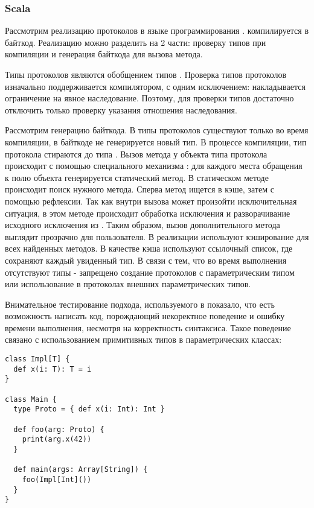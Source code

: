 \subsubsection{Scala}
Рассмотрим реализацию протоколов в языке программирования \cite{scala:structural}.  компилируется в  байткод. Реализацию можно разделить на 2 части: проверку типов при компиляции и генерация байткода для вызова метода.

Типы протоколов являются обобщением типов . Проверка типов протоколов изначально поддерживается компилятором, с одним исключением: накладывается ограничение на явное наследование. Поэтому, для проверки типов достаточно отключить только проверку указания отношения наследования.

Рассмотрим генерацию байткода. В  типы протоколов существуют только во время компиляции, в байткоде не генерируется новый тип. В процессе компиляции, тип протокола стираются до типа . Вызов метода у объекта типа протокола происходит с помощью специального механизма : для каждого места обращения к полю объекта генерируется статический метод. В статическом методе происходит поиск нужного метода. Сперва метод ищется в кэше, затем с помощью рефлексии. Так как внутри вызова может произойти исключительная ситуация, в этом методе происходит обработка исключения и разворачивание исходного исключения из . Таким образом, вызов дополнительного метода выглядит прозрачно для пользователя. В реализации используют кэширование для всех найденных методов. В качестве кэша используют ссылочный список, где сохраняют каждый увиденный тип. В связи с тем, что во время выполнения отсутствуют типы - запрещено создание протоколов с параметрическим типом или использование в протоколах внешних параметрических типов.

Внимательное тестирование подхода, используемого в  показало, что есть возможность написать код, порождающий некоректное поведение и ошибку времени выполнения, несмотря на корректность синтаксиса. Такое поведение связано с использованием примитивных типов в параметрических классах:

\begin{verbatim}
class Impl[T] {
  def x(i: T): T = i
}

class Main {
  type Proto = { def x(i: Int): Int }

  def foo(arg: Proto) {
    print(arg.x(42))
  }

  def main(args: Array[String]) {
    foo(Impl[Int]())
  }
}
\end{verbatim}

